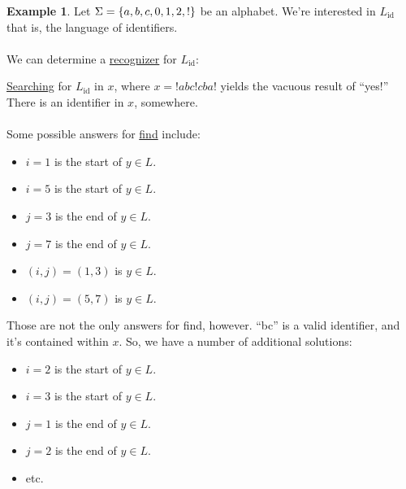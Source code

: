\documentclass[]{article}
\DeclarePairedDelimiter{\set}{\lbrace}{\rbrace}
\theoremstyle{definition}
\newtheorem{ex}{Example}[section]
\begin{document}
			\begin{ex}
				Let $\Sigma = \set{a, b, c, 0, 1, 2, !}$ be an alphabet. We're interested in $L_{\text{id}}$ \textendash{} that is, the language of identifiers.
				\\ \\
				We can determine a \underline{recognizer} for $L_{\text{id}}$:
				\begin{center}
				\end{center}

				\underline{Searching} for $L_{\text{id}}$ in $x$, where $x = !abc!cba!$ yields the vacuous result of ``yes!'' There is an identifier in $x$, somewhere.
				\\ \\
				Some possible answers for \underline{find} include:
				\begin{itemize}
					\item $i = 1$ is the start of $y \in L$.
					\item $i = 5$ is the start of $y \in L$.
					\item $j = 3$ is the end of $y \in L$.
					\item $j = 7$ is the end of $y \in L$.
					\item $(i, j) = (1, 3)$ is $y \in L$.
					\item $(i, j) = (5, 7)$ is $y \in L$.
				\end{itemize}

				Those are not the only answers for find, however. ``bc'' is a valid identifier, and it's contained within $x$. So, we have a number of additional solutions:
				\begin{itemize}
					\item $i = 2$ is the start of $y \in L$.
					\item $i = 3$ is the start of $y \in L$.
					\item $j = 1$ is the end of $y \in L$.
					\item $j = 2$ is the end of $y \in L$.
					\item etc.
				\end{itemize}


\end{ex}
\end{document}
